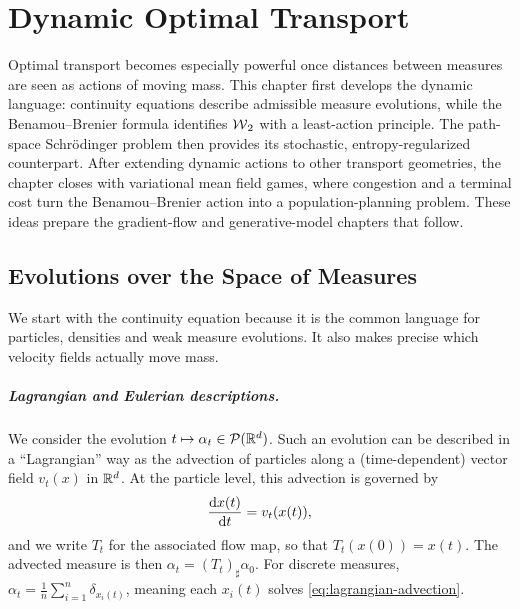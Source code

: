
\chapter{Dynamic Optimal Transport}
\label{sec-dynamic-optimal-transport}

Optimal transport becomes especially powerful once distances between measures are seen as actions of moving mass. This chapter first develops the dynamic language: continuity equations describe admissible measure evolutions, while the Benamou--Brenier formula identifies $\operatorname{\mathcal{W}}_2$ with a least-action principle. The path-space Schr\"odinger problem then provides its stochastic, entropy-regularized counterpart. After extending dynamic actions to other transport geometries, the chapter closes with variational mean field games, where congestion and a terminal cost turn the Benamou--Brenier action into a population-planning problem. These ideas prepare the gradient-flow and generative-model chapters that follow.

\section{Evolutions over the Space of Measures}

We start with the continuity equation because it is the common language for particles, densities and weak measure evolutions. It also makes precise which velocity fields actually move mass.

\paragraph{Lagrangian and Eulerian descriptions.}

We consider the evolution $t \mapsto \alpha_t \in \mathcal{P}(\mathbb{R}^d)$. Such an evolution can be described in a ``Lagrangian'' way as the advection of particles along a (time-dependent) vector field $v_t(x)$ in $\mathbb{R}^d$. At the particle level, this advection is governed by
\begin{equation}
    \frac{\mathrm{d} x(t)}{\mathrm{d} t} = v_t(x(t)), \label{eq:lagrangian-advection}
\end{equation}
and we write $T_t$ for the associated flow map, so that $T_t(x(0))=x(t)$. The advected measure is then $\alpha_t = (T_t)_\sharp \alpha_0$. For discrete measures, $\alpha_t = \frac{1}{n} \sum_{i=1}^n \delta_{x_i(t)}$, meaning each $x_i(t)$ solves \eqref{eq:lagrangian-advection}.

